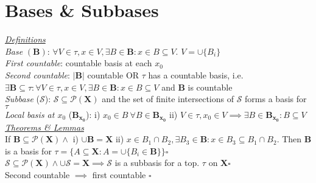 \section{Bases \& Subbases}
\underline{\emph{Definitions}}\\
\emph{Base} $(\mathbf{B})$: $\forall V\in\tau,x\in V,\exists B\in\mathbf{B}:x\in B\subseteq V$.  $V=\cup\{B_i\}$\\
\emph{First countable}: countable basis at each $x_0$\\
\emph{Second countable}: $|\mathbf{B}|$ countable OR $\tau$ has a countable basis, i.e. $\exists\mathbf{B}\subseteq\tau:\forall V\in\tau, x\in V, \exists B\in\mathbf{B}:x\in B\subseteq V$ and $\mathbf{B}$ is countable\\
\emph{Subbase} ($\mathcal{S}$): $\mathcal{S}\subseteq\mathcal{P}(\mathbf{X})$ and the set of finite intersections of $\mathcal{S}$ forms a basis for $\tau$\\
\emph{Local basis at $x_0$} ($\mathbf{B_{x_0}}$): i) $x_0\in B\ \forall B\in \mathbf{B_{x_0}}$ ii) $V\in\tau,x_0\in V\implies\exists B\in\mathbf{B_{x_0}}:B\subseteq V$
\\\underline{\emph{Theorems \& Lemmas}}\\
If $\mathbf{B}\subseteq\mathcal{P}(\mathbf{X})\land$ i) $\cup \mathbf{B}=\mathbf{X}$ ii) $x\in B_1\cap B_2,\exists B_3\in\mathbf{B}:x\in B_3\subseteq B_1\cap B_2$. Then $\mathbf{B}$ is a basis for $\tau=\{A\subseteq\mathbf{X}:A=\cup\{B_i\in\mathbf{B}\}\}\square$\\
$\mathcal{S}\subseteq\mathcal{P}(\mathbf{X})\land\cup\mathcal{S}=\mathbf{X}\implies\mathcal{S}$ is a subbasis for a top. $\tau$ on $\mathbf{X}\square$\\
Second countable $\implies$ first countable $\square$
